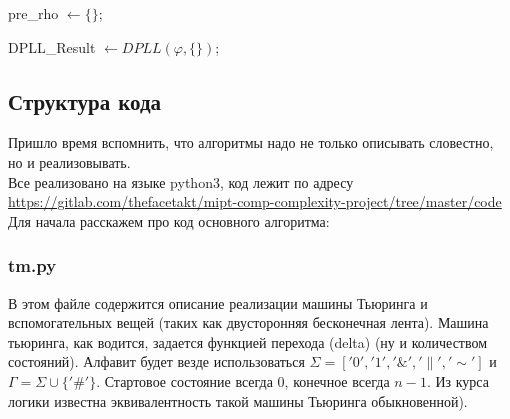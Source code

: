 \documentclass[paper=a4, fontsize=11pt]{scrartcl}
\begin{document}
\begin{algorithm}[H]
	 {


		pre\_rho $\leftarrow \{\}$;

        DPLL\_Result  $ \leftarrow DPLL(\varphi, \{\})$;

	}
\end{algorithm}



\subsection{Структура кода}

Пришло время вспомнить, что алгоритмы надо не только описывать словестно, но
и реализовывать.\\

Все реализовано на языке python3,
код лежит по адресу \url{https://gitlab.com/thefacetakt/mipt-comp-complexity-project/tree/master/code} \\

Для начала расскажем про код основного алгоритма:\\

\subsubsection{tm.py}

В этом файле содержится описание реализации машины Тьюринга и вспомогательных
вещей (таких как двусторонняя бесконечная лента). Машина тьюринга, как водится,
задается функцией перехода (delta) (ну и количеством состояний).
Алфавит будет везде использоваться $\Sigma = ['0', '1', '\&', '\|', '\sim']$ и
$\Gamma = \Sigma \cup \{'\#'\}$. Стартовое состояние всегда 0, конечное всегда
$n - 1$. Из курса логики известна эквивалентность такой машины Тьюринга
обыкновенной). \\
\end{document}
